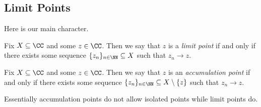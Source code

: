 \documentclass[../notes.tex]{subfiles}
\begin{document}
\subsection{Limit Points}
Here is our main character.
\begin{definition}
	Fix $X\subseteq\CC$ and some $z\in\CC$. Then we say that $z$ is a \textit{limit point} if and only if there exists some sequence $\{z_n\}_{n\in\NN}\subseteq X$ such that $z_n\to z$.
\end{definition}
\begin{definition}
	Fix $X\subseteq\CC$ and some $z\in\CC$. Then we say that $z$ is an \textit{accumulation point} if and only if there exists some sequence $\{z_n\}_{n\in\NN}\subseteq X\setminus\{z\}$ such that $z_n\to z$.
\end{definition}
Essentially accumulation points do not allow isolated points while limit points do.
\end{document}
